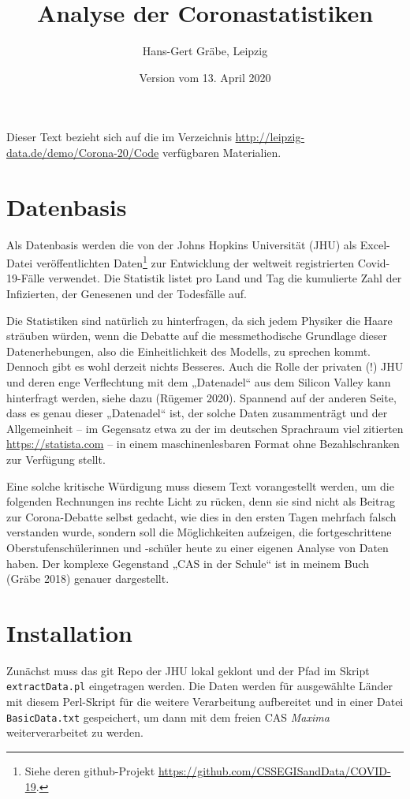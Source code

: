 \documentclass[a4paper,11pt]{article}
\title{Analyse der Coronastatistiken}
\author{Hans-Gert Gräbe, Leipzig}
\date{Version vom 13. April 2020}
\begin{document}
\maketitle

Dieser Text bezieht sich auf die im Verzeichnis
\url{http://leipzig-data.de/demo/Corona-20/Code} verfügbaren Materialien.

\section{Datenbasis}

Als Datenbasis werden die von der Johns Hopkins Universität (JHU) als
Excel-Datei veröffentlichten Daten\footnote{Siehe deren github-Projekt
  \url{https://github.com/CSSEGISandData/COVID-19}.} zur Entwicklung der
weltweit registrierten Covid-19-Fälle verwendet. Die Statistik listet pro Land
und Tag die kumulierte Zahl der Infizierten, der Genesenen und der Todesfälle
auf.

Die Statistiken sind natürlich zu hinterfragen, da sich jedem Physiker die
Haare sträuben würden, wenn die Debatte auf die messmethodische Grundlage
dieser Datenerhebungen, also die Einheitlichkeit des Modells, zu sprechen
kommt.  Dennoch gibt es wohl derzeit nichts Besseres. Auch die Rolle der
privaten (!)  JHU und deren enge Verflechtung mit dem „Datenadel“ aus dem
Silicon Valley kann hinterfragt werden, siehe dazu (Rügemer 2020).  Spannend
auf der anderen Seite, dass es genau dieser „Datenadel“ ist, der solche Daten
zusammenträgt und der Allgemeinheit -- im Gegensatz etwa zu der im deutschen
Sprachraum viel zitierten \url{https://statista.com} -- in einem
maschinenlesbaren Format ohne Bezahlschranken zur Verfügung stellt.

Eine solche kritische Würdigung muss diesem Text vorangestellt werden, um die
folgenden Rechnungen ins rechte Licht zu rücken, denn sie sind nicht als
Beitrag zur Corona-Debatte selbst gedacht, wie dies in den ersten Tagen
mehrfach falsch verstanden wurde, sondern soll die Möglichkeiten aufzeigen,
die fortgeschrittene Oberstufenschülerinnen und -schüler heute zu einer
eigenen Analyse von Daten haben.  Der komplexe Gegenstand „CAS in der Schule“
ist in meinem Buch (Gräbe 2018) genauer dargestellt. 

\section{Installation} 

Zunächst muss das git Repo der JHU lokal geklont und der Pfad im Skript
\texttt{extractData.pl} eingetragen werden.  Die Daten werden für ausgewählte
Länder mit diesem Perl-Skript für die weitere Verarbeitung aufbereitet und in
einer Datei \texttt{BasicData.txt} gespeichert, um dann mit dem freien CAS
\emph{Maxima} weiterverarbeitet zu werden.
\end{document}
